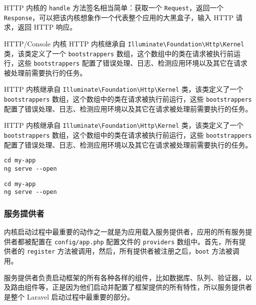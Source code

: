 \documentclass{progartcn}
\begin{document}
HTTP 内核的 \verb|handle| 方法签名相当简单：获取一个 \verb|Request|，返回一个 \verb|Response|，可以把该内核想象作一个代表整个应用的大黑盒子，输入 HTTP 请求，返回 HTTP 响应。

\begin{titledbox}{HTTP/Console 内核}
HTTP 内核继承自 \verb|Illuminate\Foundation\Http\Kernel| 类，该类定义了一个 \verb|bootstrappers| 数组，这个数组中的类在请求被执行前运行，这些 \verb|bootstrappers| 配置了错误处理、日志、检测应用环境以及其它在请求被处理前需要执行的任务。
\end{titledbox}

\begin{notebox}
  HTTP 内核继承自 \verb|Illuminate\Foundation\Http\Kernel| 类，该类定义了一个 \verb|bootstrappers| 数组，这个数组中的类在请求被执行前运行，这些 \verb|bootstrappers| 配置了错误处理、日志、检测应用环境以及其它在请求被处理前需要执行的任务。
\end{notebox}

\begin{importantbox}
  HTTP 内核继承自 \verb|Illuminate\Foundation\Http\Kernel| 类，该类定义了一个 \verb|bootstrappers| 数组，这个数组中的类在请求被执行前运行，这些 \verb|bootstrappers| 配置了错误处理、日志、检测应用环境以及其它在请求被处理前需要执行的任务。
\end{importantbox}

\begin{shellbox}
\begin{verbatim}
cd my-app
ng serve --open
\end{verbatim}
\end{shellbox}

\begin{invertedshellbox}
\begin{verbatim}
cd my-app
ng serve --open
\end{verbatim}
\end{invertedshellbox}

\subsubsection{服务提供者}

内核启动过程中最重要的动作之一就是为应用载入服务提供者，应用的所有服务提供者都被配置在 \verb|config/app.php| 配置文件的 \verb|providers| 数组中。首先，所有提供者的 \verb|register| 方法被调用，然后，所有提供者被注册之后，\verb|boot| 方法被调用。

服务提供者负责启动框架的所有各种各样的组件，比如数据库、队列、验证器，以及路由组件等，正是因为他们启动并配置了框架提供的所有特性，所以服务提供者是整个 Laravel 启动过程中最重要的部分。
\end{document}
